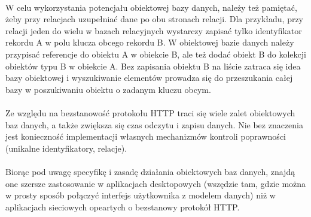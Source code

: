 \documentclass[wide,a4paper,titlepage,12pt] {article}
\begin{document}
  \paragraph{}
  W celu wykorzystania potencjału obiektowej bazy danych, należy też pamiętać, żeby przy relacjach uzupełniać dane po obu stronach relacji. Dla przykładu, przy relacji jeden do wielu w bazach relacyjnych wystarczy zapisać tylko identyfikator rekordu A w polu klucza obcego rekordu B. W obiektowej bazie danych należy przypisać referencje do obiektu A w obiekcie B, ale też dodać obiekt B do kolekcji obiektów typu B w obiekcie A. Bez zapisania obiektu B na liście zatraca się idea bazy obiektowej i wyszukiwanie elementów prowadza się do przeszukania całej bazy w poszukiwaniu obiektu o zadanym kluczu obcym.

\paragraph{}
  Ze względu na bezstanowość protokołu HTTP traci się wiele zalet obiektowych baz danych, a także zwiększa się czas odczytu i zapisu danych. Nie bez znaczenia jest konieczność implementacji własnych mechanizmów kontroli poprawności (unikalne identyfikatory, relacje).
  \paragraph{}
  Biorąc pod uwagę specyfikę i zasadę działania obiektowych baz danych, znajdą one szersze zastosowanie w aplikacjach desktopowych (wszędzie tam, gdzie można w prosty sposób połączyć interfejs użytkownika z modelem danych) niż w aplikacjach sieciowych opeartych o bezstanowy protokół HTTP.
\end{document}
